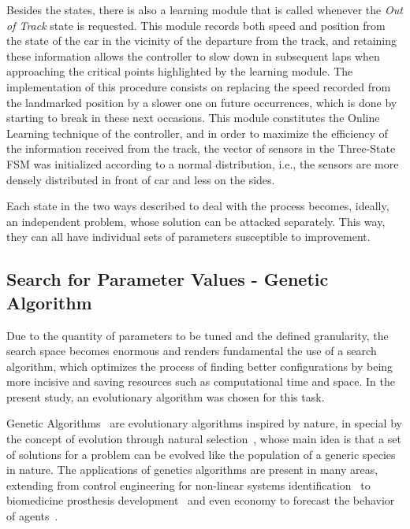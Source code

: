 	Besides the states, there is also a learning module that is called whenever the \emph{Out of Track} state is requested. This module records both speed and position from the state of the car in the vicinity of the departure from the track, and retaining these information allows the controller to slow down in subsequent laps when approaching the critical points highlighted by the learning module. The implementation of this procedure consists on replacing the speed recorded from the landmarked position by a slower one on future occurrences, which is done by starting to break in these next occasions. This module constitutes the Online Learning technique of the controller, and in order to maximize the efficiency of the information received from the track, the vector of sensors in the Three-State FSM was initialized according to a normal distribution, i.e., the sensors are more densely distributed in front of car and less on the sides.
	
	Each state in the two ways described to deal with the process becomes, ideally, an independent problem, whose solution can be attacked separately. This way, they can all have individual sets of parameters susceptible to improvement.
	
\subsection{Search for Parameter Values - Genetic Algorithm} \label{subsec:GA}
	
	Due to the quantity of parameters to be tuned and the defined granularity, the search space becomes enormous and renders fundamental the use of a search algorithm, which optimizes the process of finding better configurations by being more incisive and saving resources such as computational time and space. In the present study, an evolutionary algorithm was chosen for this task.
	
	Genetic Algorithms~\cite{GA} are evolutionary algorithms inspired by nature, in special by the concept of evolution through natural selection~\cite{Darwin}, whose main idea is that a set of solutions for a problem can be evolved like the population of a generic species in nature. The applications of genetics algorithms are present in many areas, extending from control engineering for non-linear systems identification~\cite{GACTRL} to biomedicine prosthesis development~\cite{GABIO} and even economy to forecast the behavior of agents~\cite{GAECO}.
	
